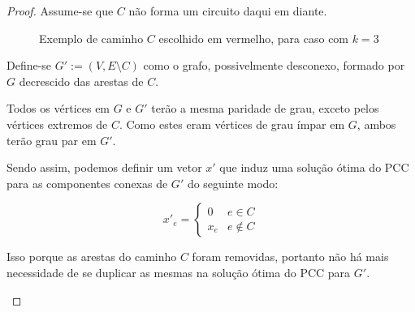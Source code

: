 \begin{proof}
    Assume-se que $C$ não forma um circuito daqui em diante.

    \begin{figure}[H]
        \centering
        \caption{Exemplo de caminho $C$ escolhido em vermelho, para caso com $k = 3$}
        \label{pcc-case1}
    \end{figure}

    Define-se $G' := (V, E \setminus C)$ como o grafo, possivelmente desconexo, formado por $G$ decrescido das arestas de $C$.

    Todos os vértices em $G$ e $G'$ terão a mesma paridade de grau, exceto pelos vértices extremos de $C$. 
    Como estes eram vértices de grau ímpar em $G$, ambos terão grau par em $G'$.

    Sendo assim, podemos definir um vetor $x'$ que induz uma solução ótima do PCC para as componentes conexas de $G'$ do seguinte modo:

    \[ 
        x'_e = 
        \begin{cases} 
            0 & e \in C \\
            x_e & e \notin C 
        \end{cases}
    \]

    Isso porque as arestas do caminho $C$ foram removidas, portanto não há mais necessidade de se duplicar as mesmas na solução ótima do PCC para $G'$.

    
    \begin{figure}[H]
        \centering
\end{figure}
\end{proof}
